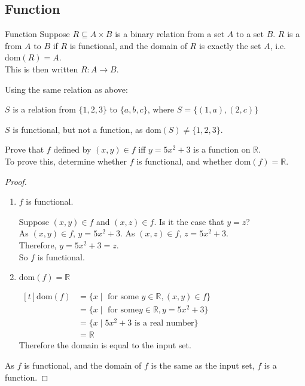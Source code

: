\documentclass[\main/notes.tex]{subfiles}
\begin{document}
			\subsection{Function}
				\begin{definition}{Function}
					Suppose $R \subseteq A \times B$ is a binary relation from a set $A$ to a set $B$. $R$ is a  from $A$ to $B$ if $R$ is functional, and the domain of $R$ is exactly the set $A$, i.e. $\mathrm{dom}(R) = A$.\\
					This is then written $R: A \rightarrow B$.
				\end{definition}
				\begin{example}
					Using the same relation as above:
						\begin{indentparagraph}
							$S$ is a relation from $\{1, 2, 3\}$ to $\{a, b, c\}$, where $S = \bigl\{(1, a), (2, c)\bigr\}$
						\end{indentparagraph}
						$S$ is functional, but not a function, as $\mathrm{dom}(S) \neq \{1, 2, 3\}$.
				\end{example}
				\begin{example}
					Prove that $f$ defined by $(x, y) \in f$ iff $y = 5x^{2} + 3$ is a function on $\mathbb{R}$.\\
					To prove this, determine whether $f$ is functional, and whether $\mathrm{dom}(f) = \mathbb{R}$.
					\begin{proof}
						$ $
						\begin{enumerate}[label=(\roman*)]
							\item $f$ is functional.
								\begin{subproof}
									Suppose $(x, y) \in f$ and $(x, z) \in f$. Is it the case that $y = z$?\\
									As $(x, y) \in f$, $y = 5x^{2} + 3$. As $(x, z) \in f$, $z = 5x^{2} + 3$.\\
									Therefore, $y = 5x^{2} + 3 = z$.\\
									So $f$ is functional. 
								\end{subproof}
							\item $\mathrm{dom}(f) = \mathbb{R}$
								\begin{subproof} $
									\begin{aligned}[t]
										\mathrm{dom}(f) &= \{x \mid \text{ for some } y \in \mathbb{R}, (x, y) \in f\}\\
										&= \{x \mid \text{ for some} y \in \mathbb{R}, y = 5x^{2} + 3\}\\
										&= \{x \mid 5x^{2} + 3 \text{ is a real number}\}\\
										&= \mathbb{R}
									\end{aligned} $\\
									Therefore the domain is equal to the input set.
								\end{subproof}
						\end{enumerate}
						As $f$ is functional, and the domain of $f$ is the same as the input set, $f$ is a function.
					\end{proof}
				\end{example}
\end{document}
